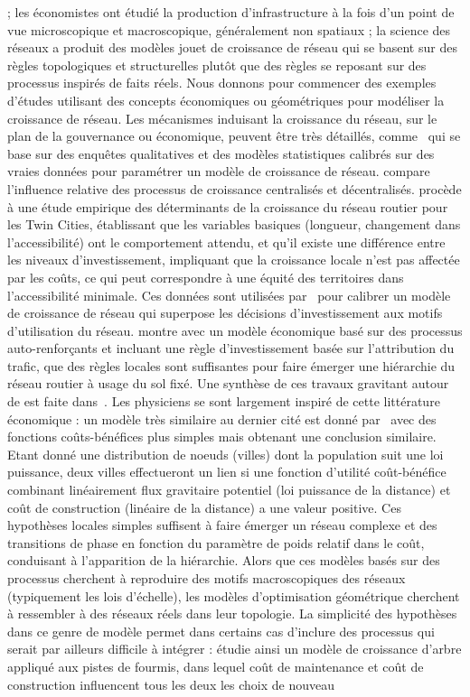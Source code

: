 {; les économistes ont étudié la production d'infrastructure à la fois d'un point de vue microscopique et macroscopique, généralement non spatiaux ; la science des réseaux a produit des modèles jouet de croissance de réseau qui se basent sur des règles topologiques et structurelles plutôt que des règles se reposant sur des processus inspirés de faits réels. Nous donnons pour commencer des exemples d'études utilisant des concepts économiques ou géométriques pour modéliser la croissance de réseau. Les mécanismes induisant la croissance du réseau, sur le plan de la gouvernance ou économique, peuvent être très détaillés, comme~\cite{levinson2012forecasting} qui se base sur des enquêtes qualitatives et des modèles statistiques calibrés sur des vraies données pour paramétrer un modèle de croissance de réseau. \cite{xie2009jurisdictional} compare l'influence relative des processus de croissance centralisés et décentralisés. \cite{levinson2003induced} procède à une étude empirique des déterminants de la croissance du réseau routier pour les Twin Cities, établissant que les variables basiques (longueur, changement dans l'accessibilité) ont le comportement attendu, et qu'il existe une différence entre les niveaux d'investissement, impliquant que la croissance locale n'est pas affectée par les coûts, ce qui peut correspondre à une équité des territoires dans l'accessibilité minimale. Ces données sont utilisées par~\cite{zhang2016model} pour calibrer un modèle de croissance de réseau qui superpose les décisions d'investissement aux motifs d'utilisation du réseau. \cite{yerra2005emergence} montre avec un modèle économique basé sur des processus auto-renforçants et incluant une règle d'investissement basée sur l'attribution du trafic, que des règles locales sont suffisantes pour faire émerger une hiérarchie du réseau routier à usage du sol fixé. Une synthèse de ces travaux gravitant autour de  est faite dans~\cite{xie2011evolving}. Les physiciens se sont largement inspiré de cette littérature économique : un modèle très similaire au dernier cité est donné par~\cite{louf2013emergence} avec des fonctions coûts-bénéfices plus simples mais obtenant une conclusion similaire. Etant donné une distribution de noeuds (villes) dont la population suit une loi puissance, deux villes effectueront un lien si une fonction d'utilité coût-bénéfice combinant linéairement flux gravitaire potentiel (loi puissance de la distance) et coût de construction (linéaire de la distance) a une valeur positive. Ces hypothèses locales simples suffisent à faire émerger un réseau complexe et des transitions de phase en fonction du paramètre de poids relatif dans le coût, conduisant à l'apparition de la hiérarchie. Alors que ces modèles basés sur des processus cherchent à reproduire des motifs macroscopiques des réseaux (typiquement les lois d'échelle), les modèles d'optimisation géométrique cherchent à ressembler à des réseaux réels dans leur topologie. La simplicité des hypothèses dans ce genre de modèle permet dans certains cas d'inclure des processus qui serait par ailleurs difficile à intégrer : \cite{2016arXiv160906470B} étudie ainsi un modèle de croissance d'arbre appliqué aux pistes de fourmis, dans lequel coût de maintenance et coût de construction influencent tous les deux les choix de nouveau }

